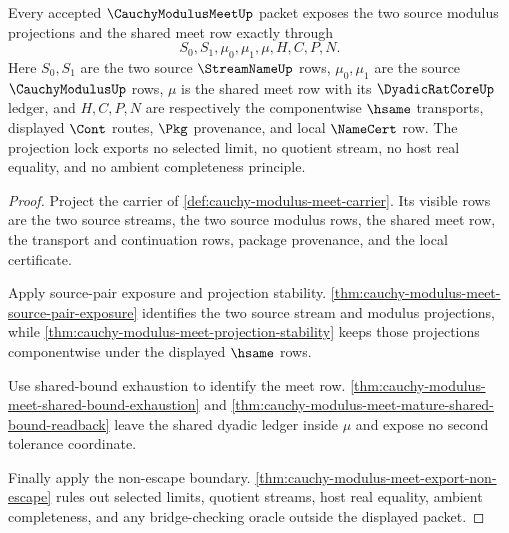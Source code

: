 \begin{theorem}
\label{thm:cauchy-modulus-meet-binary-meet-projection-lock}
Every accepted $\CauchyModulusMeetUp$ packet exposes the two source modulus projections and the shared meet row exactly through
$$
S_0,S_1,\mu_0,\mu_1,\mu,H,C,P,N.
$$
Here $S_0,S_1$ are the two source $\StreamNameUp$ rows, $\mu_0,\mu_1$ are the source $\CauchyModulusUp$ rows, $\mu$ is the shared meet row with its $\DyadicRatCoreUp$ ledger, and $H,C,P,N$ are respectively the componentwise $\hsame$ transports, displayed $\Cont$ routes, $\Pkg$ provenance, and local $\NameCert$ row. The projection lock exports no selected limit, no quotient stream, no host real equality, and no ambient completeness principle.
\end{theorem}
\begin{proof}
Project the carrier of \autoref{def:cauchy-modulus-meet-carrier}. Its visible rows are the two source streams, the two source modulus rows, the shared meet row, the transport and continuation rows, package provenance, and the local certificate.

Apply source-pair exposure and projection stability. \autoref{thm:cauchy-modulus-meet-source-pair-exposure} identifies the two source stream and modulus projections, while \autoref{thm:cauchy-modulus-meet-projection-stability} keeps those projections componentwise under the displayed $\hsame$ rows.

Use shared-bound exhaustion to identify the meet row. \autoref{thm:cauchy-modulus-meet-shared-bound-exhaustion} and \autoref{thm:cauchy-modulus-meet-mature-shared-bound-readback} leave the shared dyadic ledger inside $\mu$ and expose no second tolerance coordinate.

Finally apply the non-escape boundary. \autoref{thm:cauchy-modulus-meet-export-non-escape} rules out selected limits, quotient streams, host real equality, ambient completeness, and any bridge-checking oracle outside the displayed packet.
\end{proof}

